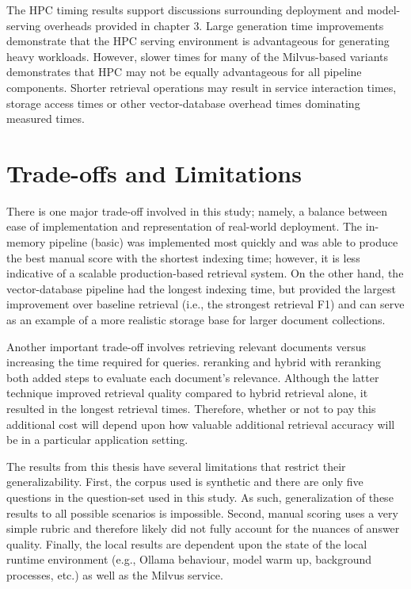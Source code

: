 The \ac{HPC} timing results support discussions surrounding deployment and model-serving overheads provided in chapter 3. Large generation time improvements demonstrate that the \ac{HPC} serving environment is advantageous for generating heavy workloads. However, slower times for many of the Milvus-based variants demonstrates that \ac{HPC} may not be equally advantageous for all pipeline components. Shorter retrieval operations may result in service interaction times, storage access times or other vector-database overhead times dominating measured times.

\section{Trade-offs and Limitations}

There is one major trade-off involved in this study; namely, a balance between ease of implementation and representation of real-world deployment. The in-memory pipeline (basic) was implemented most quickly and was able to produce the best manual score with the shortest indexing time; however, it is less indicative of a scalable production-based retrieval system. On the other hand, the vector-database pipeline had the longest indexing time, but provided the largest improvement over baseline retrieval (i.e., the strongest retrieval F1) and can serve as an example of a more realistic storage base for larger document collections.

Another important trade-off involves retrieving relevant documents versus increasing the time required for queries. reranking and hybrid with reranking both added steps to evaluate each document's relevance. Although the latter technique improved retrieval quality compared to hybrid retrieval alone, it resulted in the longest retrieval times. Therefore, whether or not to pay this additional cost will depend upon how valuable additional retrieval accuracy will be in a particular application setting.

The results from this thesis have several limitations that restrict their generalizability. First, the corpus used is synthetic and there are only five questions in the question-set used in this study. As such, generalization of these results to all possible scenarios is impossible. Second, manual scoring uses a very simple rubric and therefore likely did not fully account for the nuances of answer quality. Finally, the local results are dependent upon the state of the local runtime environment (e.g., Ollama behaviour, model warm up, background processes, etc.) as well as the Milvus service.

